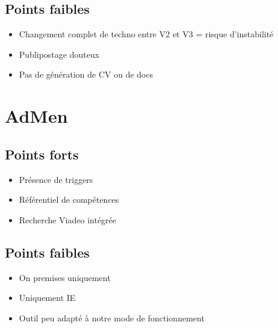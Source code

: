 \documentclass[12pt,twoside]{scrreprt}
\begin{document}
\subsection{Points faibles}
\begin{itemize}
	\item Changement complet de techno entre V2 et V3 = risque d'instabilité
	\item Publipostage douteux
	\item Pas de génération de CV ou de docs
\end{itemize}


\section{AdMen}

\subsection{Points forts}
\begin{itemize}
	\item Présence de triggers
	\item Référentiel de compétences
	\item Recherche Viadeo intégrée
\end{itemize}
\subsection{Points faibles}
\begin{itemize}
	\item On premises uniquement
	\item Uniquement IE
	\item Outil peu adapté à notre mode de fonctionnement
\end{itemize}

%

% 
\end{document}
